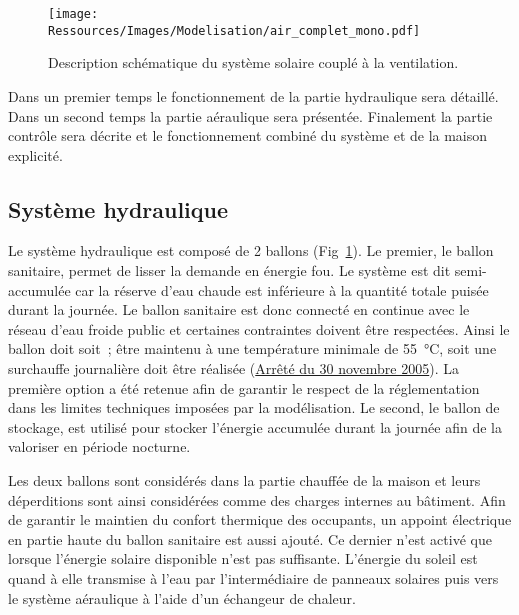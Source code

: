 \begin{figure}
    \begin{center}
        \texttt{[image: Ressources/Images/Modelisation/air\_complet\_mono.pdf]}
    \end{center}
    \caption{Description schématique du système solaire couplé à la ventilation.
             \label{fig:air_complet_mono}}
\end{figure}

Dans un premier temps le fonctionnement de la partie hydraulique sera détaillé. Dans un
second temps la partie aéraulique sera présentée. Finalement la partie contrôle sera
décrite et le fonctionnement combiné du système et de la maison explicité.

\subsection{Système hydraulique} %
\label{sub:systeme_hydraulique}
Le système hydraulique est composé de 2 ballons (Fig~\ref{fig:air_complet_mono}). Le
premier, le ballon sanitaire, permet de lisser la demande en énergie fou. Le système est
dit semi-accumulée car la réserve d’eau chaude est inférieure à la quantité totale puisée
durant la journée. Le ballon sanitaire est donc connecté en continue avec le réseau d’eau
froide public et certaines contraintes doivent être respectées. Ainsi le ballon doit soit~;
être maintenu à une température minimale de \SI{55}{\celsius}, soit une surchauffe
journalière doit être réalisée
(\href{https://www.legifrance.gouv.fr/affichTexte.do?cidTexte=JORFTEXT000000423756}{Arrêté
du 30 novembre 2005}). La première option a été retenue afin de garantir le respect de la
réglementation dans les limites techniques imposées par la modélisation. Le second, le
ballon de stockage, est utilisé pour stocker l’énergie accumulée durant la journée afin de
la valoriser en période nocturne.

Les deux ballons sont considérés dans la partie chauffée de la maison et leurs
déperditions sont ainsi considérées comme des charges internes au bâtiment. Afin de
garantir le maintien du confort thermique des occupants, un appoint électrique en partie
haute du ballon sanitaire est aussi ajouté. Ce dernier n’est activé que lorsque l’énergie
solaire disponible n’est pas suffisante. L’énergie du soleil est quand à elle transmise à
l’eau par l’intermédiaire de panneaux solaires puis vers le système aéraulique à l’aide
d’un échangeur de chaleur.


